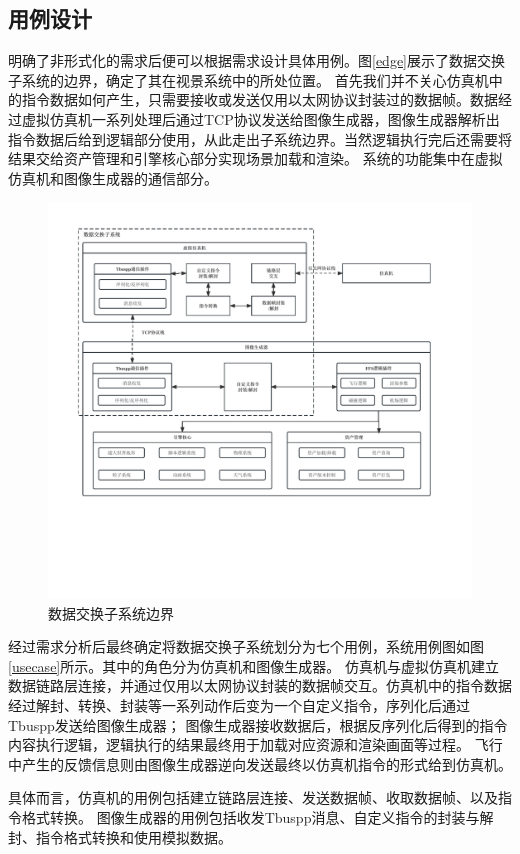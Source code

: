 \subsection{用例设计}
明确了非形式化的需求后便可以根据需求设计具体用例。图\ref{edge}展示了数据交换子系统的边界，确定了其在视景系统中的所处位置。
首先我们并不关心仿真机中的指令数据如何产生，只需要接收或发送仅用以太网协议封装过的数据帧。数据经过虚拟仿真机一系列处理后通过TCP协议发送给图像生成器，图像生成器解析出指令数据后给到逻辑部分使用，从此走出子系统边界。当然逻辑执行完后还需要将结果交给资产管理和引擎核心部分实现场景加载和渲染。
系统的功能集中在虚拟仿真机和图像生成器的通信部分。
\begin{figure}[h]
    \begin{center}
        \includegraphics[width=\textwidth]{pictures/sysedge.pdf}
        \caption{数据交换子系统边界}
        \label{sysedge}
    \end{center}
\end{figure}
\par
经过需求分析后最终确定将数据交换子系统划分为七个用例，系统用例图如图\ref{usecase}所示。其中的角色分为仿真机和图像生成器。
仿真机与虚拟仿真机建立数据链路层连接，并通过仅用以太网协议封装的数据帧交互。仿真机中的指令数据经过解封、转换、封装等一系列动作后变为一个自定义指令，序列化后通过Tbuspp发送给图像生成器；
图像生成器接收数据后，根据反序列化后得到的指令内容执行逻辑，逻辑执行的结果最终用于加载对应资源和渲染画面等过程。
飞行中产生的反馈信息则由图像生成器逆向发送最终以仿真机指令的形式给到仿真机。
\par
具体而言，仿真机的用例包括建立链路层连接、发送数据帧、收取数据帧、以及指令格式转换。
图像生成器的用例包括收发Tbuspp消息、自定义指令的封装与解封、指令格式转换和使用模拟数据。

